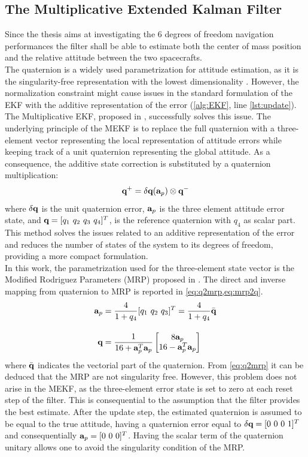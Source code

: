 \subsection{The Multiplicative Extended Kalman Filter}
\label{sec:MEKF}
Since the thesis aims at investigating the 6 degrees of freedom navigation performances the filter shall be able to estimate both the center of mass position and the relative attitude between the two spacecrafts.\\
The quaternion is a widely used parametrization for attitude estimation, as it is the singularity-free representation with the lowest dimensionality \cite{markley2014fundamentals}. However, the normalization constraint might cause issues in the standard formulation of the EKF with the additive representation of the error (\cref{alg:EKF}, line \ref{lst:update}). The Multiplicative EKF, proposed in \cite{lefferts1982kalman}, successfully solves this issue. The underlying principle of the MEKF is to replace the full quaternion with a three-element vector representing the local representation of attitude errors while keeping track of a unit quaternion representing the global attitude. As a consequence, the additive state correction is substituted by a quaternion multiplication:
\begin{equation}
    \mathrm{\textbf{q}}^+ = \delta\mathrm{\textbf{q}}(\mathrm{\textbf{a}}_p)\otimes\mathrm{\textbf{q}}^-
\end{equation}
where $\delta\mathrm{\textbf{q}}$ is the unit quaternion error, $\mathrm{\textbf{a}}_p$ is the three element attitude error state, and $\mathrm{\textbf{q}} =  [q_1\ q_2\ q_3\ q_4]^T$, is the reference quaternion  with $q_4$ as scalar part. This method solves the issues related to an additive representation of the error and reduces the number of states of the system to its degrees of freedom, providing a more compact formulation. \\
In this work, the parametrization used for the three-element state vector is the Modified Rodriguez Parameters (MRP) proposed in \cite{tweddle2015relative}. The direct and inverse mapping from quaternion to MRP is reported in \cref{eq:q2mrp,eq:mrp2q}.
\begin{align}
        \label{eq:q2mrp}
    \mathrm{\textbf{a}}_p &= \dfrac{4}{1+q_4}[q_1\ q_2\ q_3]^T = \dfrac{4}{1+q_4}\bar{\mathrm{\textbf{q}}}\\[1em]\label{eq:mrp2q}
    \mathrm{\textbf{q}} &= \dfrac{1}{16+ \mathrm{\textbf{a}}_p^T\mathrm{\textbf{a}}_p}\begin{bmatrix}
        8\mathrm{\textbf{a}}_p\\ 16-\mathrm{\textbf{a}}_p^T\mathrm{\textbf{a}}_p
    \end{bmatrix}
\end{align}
where $\bar{\mathrm{\textbf{q}}}$ indicates the vectorial part of the quaternion. From \cref{eq:q2mrp} it can be deduced that the MRP are not singularity free. However, this problem does not arise in the MEKF, as the three-element error state is set to zero at each reset step of the filter. This is consequential to the assumption that the filter provides the best estimate. After the update step, the estimated quaternion is assumed to be equal to the true attitude, having a quaternion error equal to $\delta\vect{q}=[0\ 0\ 0\ 1]^T$ and consequentially $\mathrm{\textbf{a}}_p = [0\ 0\ 0]^T$. Having the scalar term of the quaternion unitary allows one to avoid the singularity condition of the MRP.
